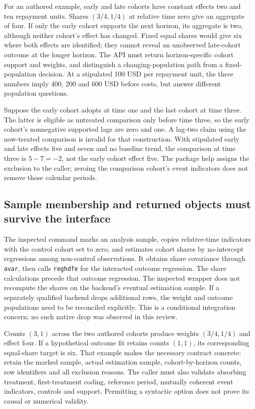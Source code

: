 For an authored example, early and late cohorts have constant effects two and
ten repayment units. Shares $(3/4,1/4)$ at relative time zero give an aggregate
of four. If only the early cohort supports the next horizon, its aggregate is
two, although neither cohort's effect has changed. Fixed equal shares would
give six where both effects are identified; they cannot reveal an unobserved
late-cohort outcome at the longer horizon. The API must return horizon-specific
cohort support and weights, and distinguish a changing-population path from a
fixed-population decision. At a stipulated 100 USD per repayment unit, the
three numbers imply 400, 200 and 600 USD before costs, but answer different
population questions.
\citep{exec24_eventstudy_contract}

Suppose the early cohort adopts at time one and the last cohort at time three.
The latter is eligible as untreated comparison only before time three, so the
early cohort's nonnegative supported lags are zero and one. A lag-two claim
using the now-treated comparison is invalid for that construction. With
stipulated early and late effects five and seven and no baseline trend, the
comparison at time three is $5-7=-2$, not the early cohort effect five. The
package help assigns the exclusion to the caller; zeroing the comparison
cohort's event indicators does not remove those calendar periods.
\citep{exec24_eventstudy_sources,exec24_eventstudy_contract}

\subsection{Sample membership and returned objects must survive the interface}
The inspected command marks an analysis sample, copies relative-time
indicators with the control cohort set to zero, and estimates cohort shares
by no-intercept regressions among non-control observations. It obtains share
covariance through \texttt{avar}, then calls \texttt{reghdfe} for the interacted
outcome regression. The share calculations precede that outcome regression.
The inspected wrapper does not recompute the shares on the backend's eventual
estimation sample. If a separately qualified backend drops additional rows,
the weight and outcome populations need to be reconciled explicitly.
This is a conditional integration concern; no such native drop was observed
in this review.
\citep{exec24_eventstudy_sources}

Counts $(3,1)$ across the two authored cohorts produce weights $(3/4,1/4)$ and
effect four. If a hypothetical outcome fit retains counts $(1,1)$, its
corresponding equal-share target is six. That example makes the necessary
contract concrete: retain the marked sample, actual estimation sample,
cohort-by-horizon counts, row identifiers and all exclusion reasons. The
caller must also validate absorbing treatment, first-treatment coding,
reference period, mutually coherent event indicators, controls and support.
Permitting a syntactic option does not prove its causal or numerical validity.
\citep{exec24_eventstudy_contract}

